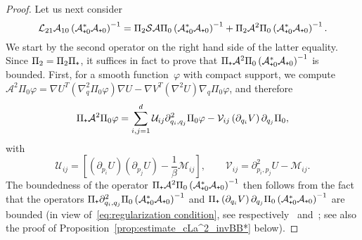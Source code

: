 \documentclass{article}
\newcommand{\cL}{\mathcal{L}}
\newcommand{\cLs}{\mathcal{S}}
\newcommand{\cLa}{\mathcal{A}}
\newcommand{\subplus}{\textnormal{\texttt{+}}}
\begin{document}
\begin{proof}
Let us next consider
\begin{equation}
  \label{eq:op_for_Ass5}
  \cL_{21}\cLa_{10} \left(\cLa_{\subplus 0}^*\cLa_{\subplus 0}\right)^{-1} = \Pi_2 \cLs \cLa \Pi_0 \left(\cLa_{\subplus 0}^*\cLa_{\subplus 0}\right)^{-1} + \Pi_2 \cLa^2 \Pi_0 \left(\cLa_{\subplus 0}^*\cLa_{\subplus 0}\right)^{-1}.
\end{equation}
We start by the second operator on the right hand side of the latter equality. Since $\Pi_2 = \Pi_2 \Pi_\subplus$, it suffices in fact to prove that $\Pi_\subplus\cLa^2 \Pi_0 \left(\cLa_{\subplus 0}^*\cLa_{\subplus 0}\right)^{-1}$ is bounded. First, for a smooth function~$\varphi$ with compact support, we compute 
$\cLa^2\Pi_0\varphi = \nabla U^T(\nabla^2_q \Pi_0 \varphi) \nabla U - \nabla V^T (\nabla^2 U) \nabla_q \Pi_0\varphi$, %
and therefore
\begin{equation}
  \label{eq:action_cLa2}
\Pi_\subplus\cLa^2 \Pi_0 \varphi = \sum_{i,j=1}^d \mathcal{U}_{ij} \partial^2_{q_i,q_j} \Pi_0 \varphi - \mathcal{V}_{ij} \left(\partial_{q_i} V\right) \partial_{q_j} \Pi_0,
\end{equation}
with 
\begin{equation}
  \label{eq:Sij_Tij}
  \mathcal{U}_{ij} = \left[\left(\partial_{p_i} U\right)\left(\partial_{p_j} U\right)-\frac1\beta \mathcal{M}_{ij}\right], 
  \qquad
  \mathcal{V}_{ij} =  \partial^2_{p_i, p_j}U - \mathcal{M}_{ij}.
\end{equation}
The boundedness of the operator $\Pi_\subplus\cLa^2 \Pi_0 \left(\cLa_{\subplus 0}^*\cLa_{\subplus 0}\right)^{-1}$ then follows from the fact that the operators $\Pi_\subplus\partial^2_{q_i,q_j} \Pi_0 \left(\cLa_{\subplus 0}^*\cLa_{\subplus 0}\right)^{-1}$ and $\Pi_\subplus\left(\partial_{q_i} V\right) \partial_{q_j} \Pi_0 \left(\cLa_{\subplus 0}^*\cLa_{\subplus 0}\right)^{-1}$ are bounded (in view of~\eqref{eq:regularization condition}, see respectively~\cite[Proposition~5]{DMS15} and~\cite[Lemma~A.4]{ST18}; see also the proof of Proposition~\ref{prop:estimate_cLa^2_invBB*} below).


\end{proof}
\end{document}
